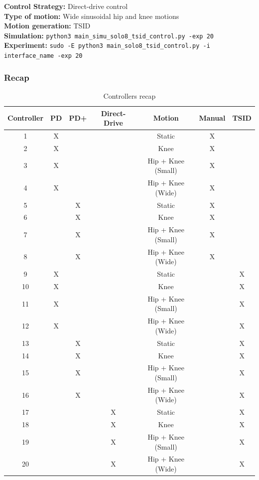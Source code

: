 \documentclass[12pt,a4paper]{article}
\begin{document}
\textbf{Control Strategy:} Direct-drive control \\
\textbf{Type of motion:} Wide sinusoidal hip and knee motions \\
\textbf{Motion generation:} TSID \\
\textbf{Simulation:} \texttt{python3 main\_simu\_solo8\_tsid\_control.py -exp 20} \\
\textbf{Experiment:} \texttt{sudo -E python3 main\_solo8\_tsid\_control.py -i interface\_name -exp 20} \\


\subsubsection{Recap}

\begin{table}[ht]
    \centering
    \begin{tabular}{|c|c|c|c|c|c|c|}
    \hline
        \textbf{Controller} & \textbf{PD} & \textbf{PD+} & \textbf{Direct-Drive} & \textbf{Motion} & \textbf{Manual} & \textbf{TSID} \\
        \hline
        \hline
        1 & X & & & Static & X & \\
        2 & X & & & Knee & X & \\
        3 & X & & & Hip + Knee (Small) & X & \\
        4 & X & & & Hip + Knee (Wide) & X & \\
        \hline
        5 & & X & & Static & X & \\
        6 & & X & & Knee & X & \\
        7 & & X & & Hip + Knee (Small) & X & \\
        8 & & X & & Hip + Knee (Wide) & X & \\
        \hline
        9 & X & & & Static & & X \\
        10 & X & & & Knee & & X \\
        11 & X & & & Hip + Knee (Small) & & X \\
        12 & X & & & Hip + Knee (Wide) & & X \\
        \hline
        13 & & X & & Static & & X \\
        14 & & X & & Knee & & X \\
        15 & & X & & Hip + Knee (Small) & & X \\
        16 & & X & & Hip + Knee (Wide) & & X \\
        \hline
        17 & & & X & Static & & X \\
        18 & & & X & Knee & & X \\
        19 & & & X & Hip + Knee (Small) & & X \\
        20 & & & X & Hip + Knee (Wide) & & X \\
        \hline
    \end{tabular}
    \caption{Controllers recap}
    \label{tab:recap}
\end{table}
\end{document}

